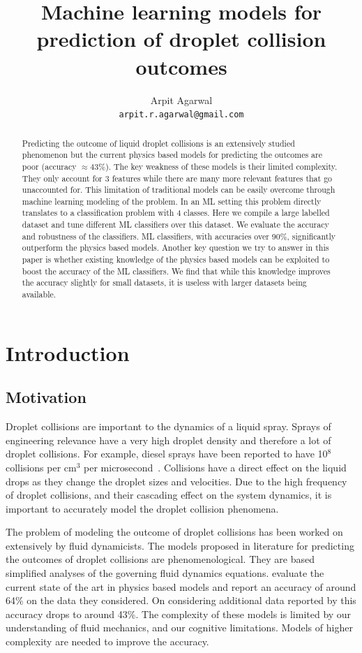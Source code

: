 \documentclass{article}
\title{Machine learning models for prediction of droplet collision outcomes}
\author{
  Arpit Agarwal \\
  \texttt{arpit.r.agarwal@gmail.com} \\
}
\begin{document}

\maketitle

\begin{abstract}
Predicting the outcome of liquid droplet collisions is an extensively studied phenomenon but the current physics based models for predicting the outcomes are poor (accuracy $\approx 43\%$). The key weakness of these models is their limited complexity. They only account for 3 features while there are many more relevant features that go unaccounted for. This limitation of traditional models can be easily overcome through machine learning modeling of the problem. In an ML setting this problem directly translates to a classification problem with 4 classes. Here we compile a large labelled dataset and tune different ML classifiers over this dataset. We evaluate the accuracy and robustness of the classifiers. ML classifiers, with accuracies over 90\%, significantly outperform the physics based models. Another key question we try to answer in this paper is whether existing knowledge of the physics based models can be exploited to boost the accuracy of the ML classifiers. We find that while this knowledge improves the accuracy slightly for small datasets, it is useless with larger datasets being available.
\end{abstract}

\section{Introduction}
\subsection{Motivation}
Droplet collisions are important to the dynamics of a liquid spray. Sprays of engineering relevance have a very high droplet density and therefore a lot of droplet collisions. For example, diesel sprays have been reported to have 10$^8$ collisions per cm$^3$ per microsecond~\cite{macinnes1991comparisons}. Collisions have a direct effect on the liquid drops as they change the droplet sizes and velocities. Due to the high frequency of droplet collisions, and their cascading effect on the system dynamics, it is important to accurately model the droplet collision phenomena.

The problem of modeling the outcome of droplet collisions has been worked on extensively by fluid dynamicists. The models proposed in literature for predicting the outcomes of droplet collisions are phenomenological. They are based simplified analyses of the governing fluid dynamics equations. \citet{agarwal2019computational} evaluate the current state of the art in physics based models and report an accuracy of around 64\% on the data they considered. On considering additional data reported by \citet{sommerfeld2016modelling} this accuracy drops to around 43\%. The complexity of these models is limited by our understanding of fluid mechanics, and our cognitive limitations. Models of higher complexity are needed to improve the accuracy.
\end{document}
